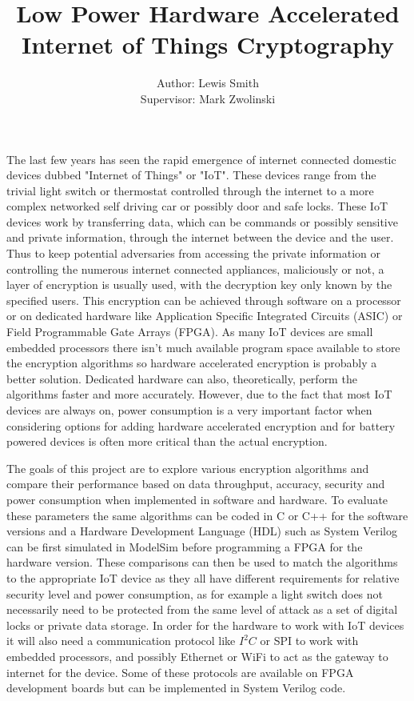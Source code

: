 \documentclass[12pt]{article}
\title{\vspace{-20mm}Low Power Hardware Accelerated Internet of Things Cryptography}
\author{Author: Lewis Smith\\ Supervisor: Mark Zwolinski}
\begin{document}
   
   
   The last few years has seen the rapid emergence of internet connected domestic devices dubbed "Internet of Things" or "IoT". These devices range from the trivial light switch or thermostat controlled through the internet to a more complex networked self driving car or possibly door and safe locks. These IoT devices work by transferring data, which can be commands or possibly sensitive and private information, through the internet between the device and the user. Thus to keep potential adversaries from accessing the private information or controlling the numerous internet connected appliances, maliciously or not, a layer of encryption is usually used, with the decryption key only known by the specified users. This encryption can be achieved through software on a processor or on dedicated hardware like Application Specific Integrated Circuits (ASIC) or Field Programmable Gate Arrays (FPGA). As many IoT devices are small embedded processors there isn't much available program space available to store the encryption algorithms so hardware accelerated encryption is probably a better solution. Dedicated hardware can also, theoretically, perform the algorithms faster and more accurately. However, due to the fact that most IoT devices are always on, power consumption is a very important factor when considering options for adding hardware accelerated encryption and for battery powered devices is often more critical than the actual encryption. 
   
   The goals of this project are to explore various encryption algorithms and compare their performance based on data throughput, accuracy, security and power consumption when implemented in software and hardware. To evaluate these parameters the same algorithms can be coded in C or C++ for the software versions and a Hardware Development Language (HDL) such as System Verilog can be first simulated in ModelSim before programming a FPGA for the hardware version. These comparisons can then be used to match the algorithms to the appropriate IoT device as they all have different requirements for relative security level and power consumption, as for example a light switch does not necessarily need to be protected from the same level of attack as a set of digital locks or private data storage. In order for the hardware to work with IoT devices it will also need a communication protocol like $I^2 C$ or SPI to work with embedded processors, and possibly Ethernet or WiFi to act as the gateway to internet for the device. Some of these protocols are available on FPGA development boards but can be implemented in System Verilog code.
   
\end{document}
